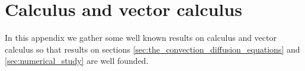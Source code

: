 
\section{Calculus and vector calculus}

In this appendix we gather some well known results on calculus and vector
calculus so that results on sections
\ref{sec:the_convection_diffusion_equations} and \ref{sec:numerical_study} are
well founded.

\begin{theorem}
	
\end{theorem}

\begin{theorem}
	
\end{theorem}
